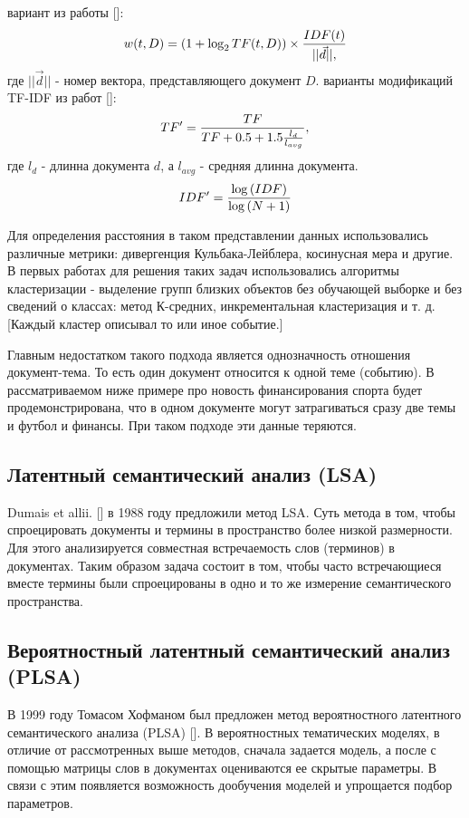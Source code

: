  вариант из работы [\todo{}]:
$$
w(t,D)=(1+\log_2{TF(t,D)}) \times {{IDF(t)}\over{||\vec{d}||},}
$$
где $||\vec{d}||$ - номер вектора, представляющего документ $D$.
 варианты модификаций TF-IDF из работ [\todo{}]:
$$
TF'={{TF}\over{TF+0.5+1.5{{l_d}\over{l_{avg}}}}},
$$
где $l_d$ - длинна документа $d$, а $l_{avg}$ - средняя длинна документа.
$$
IDF'={{\log{(IDF)}}\over{\log{(N+1)}}}
$$

Для определения расстояния в таком представлении данных использовались различные метрики: дивергенция Кульбака-Лейблера, косинусная мера и другие. В первых работах для решения таких задач использовались алгоритмы кластеризации - выделение групп близких объектов без обучающей выборке и без сведений о классах: метод К-средних, инкрементальная кластеризация и т. д.[Каждый кластер описывал то или иное событие.]

Главным недостатком такого подхода является однозначность отношения документ-тема. То есть один документ относится к одной теме (событию). В рассматриваемом ниже примере про новость финансирования спорта будет продемонстрирована, что в одном документе могут затрагиваться сразу две темы и футбол и финансы. При таком подходе эти данные теряются.
\subsection{Латентный семантический анализ (LSA)}

Dumais et allii. [\todo{}] в 1988 году предложили метод LSA. Суть метода в том, чтобы спроецировать документы и термины в пространство более низкой размерности. Для этого анализируется совместная встречаемость слов (терминов) в документах. Таким образом задача состоит в том, чтобы часто встречающиеся вместе термины были спроецированы в одно и то же измерение семантического пространства.


\subsection{Вероятностный латентный семантический анализ (PLSA)}

В 1999 году Томасом Хофманом был предложен метод вероятностного латентного семантического анализа (PLSA) [\todo{}]. В вероятностных тематических моделях, в отличие от рассмотренных выше методов, сначала задается модель, а после с помощью матрицы слов в документах оцениваются ее скрытые параметры. В связи с этим появляется возможность дообучения моделей и упрощается подбор параметров.

